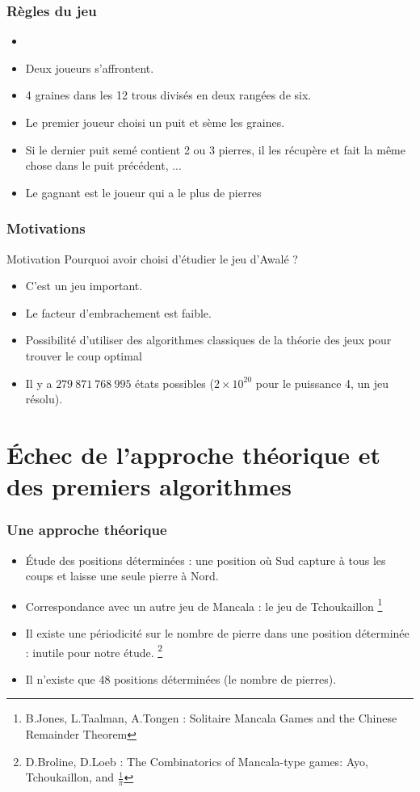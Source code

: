 \documentclass{beamer}
\begin{document}
\begin{frame}
  \frametitle{Règles du jeu}
  \begin{itemize}
  \item<Règles du jeu>
  \item Deux joueurs s'affrontent.
  \item 4 graines dans les 12 trous divisés en deux rangées de six.
  \item Le premier joueur choisi un puit et sème les graines.
  \item Si le dernier puit semé contient 2 ou 3 pierres, il les récupère et fait la même chose dans le puit précédent, ...
  \item Le gagnant est le joueur qui a le plus de pierres
  \end{itemize}
\end{frame}

\begin{frame}
  \frametitle{Motivations}
  \begin{block}{Motivation}
    Pourquoi avoir choisi d'étudier le jeu d'Awalé ?
  \end{block}
  
  \begin{itemize}
  \item C'est un jeu important.
  \item Le facteur d'embrachement est faible.
  \item Possibilité d'utiliser des algorithmes classiques de la théorie des jeux pour trouver le coup optimal
  \item Il y a $279 \ 871 \ 768 \ 995 $ états possibles ($2\times 10^{20}$ pour le puissance 4, un jeu résolu).
  \end{itemize}
\end{frame}

\section{Échec de l'approche théorique et des premiers algorithmes}
\begin{frame}
  \frametitle{Une approche théorique}
  \begin{itemize}
  \item Étude des positions déterminées : une position où Sud capture à tous les coups et laisse une seule pierre à Nord.
  \item Correspondance avec un autre jeu de Mancala : le jeu de Tchoukaillon \footnote{B.Jones, L.Taalman, A.Tongen : Solitaire Mancala Games and the Chinese Remainder Theorem}
  \item Il existe une périodicité sur le nombre de pierre dans une position déterminée : inutile pour notre étude. \footnote{D.Broline, D.Loeb : The Combinatorics of Mancala-type games: Ayo, Tchoukaillon, and $\frac 1 \pi$}
  \item Il n'existe que 48 positions déterminées (le nombre de pierres).
  \end{itemize}
\end{frame}
\end{document}
